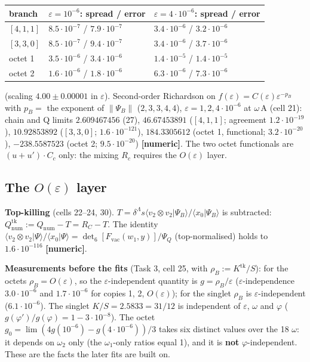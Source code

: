 \documentclass[10pt]{article}
\begin{document}
\begin{center}\small\setlength{\tabcolsep}{3pt}\begin{longtable}{@{}lll@{}}\toprule
\textbf{branch} & \textbf{$\varepsilon=10^{-6}$: spread / error} & \textbf{$\varepsilon=4\cdot10^{-6}$: spread / error} \\\midrule\endhead
$[4,1,1]$ & $8.5\cdot10^{-7}$ / $7.9\cdot10^{-7}$ & $3.4\cdot10^{-6}$ / $3.2\cdot10^{-6}$ \\
$[3,3,0]$ & $8.5\cdot10^{-7}$ / $9.4\cdot10^{-7}$ & $3.4\cdot10^{-6}$ / $3.7\cdot10^{-6}$ \\
octet 1 & $3.5\cdot10^{-6}$ / $3.4\cdot10^{-6}$ & $1.4\cdot10^{-5}$ / $1.4\cdot10^{-5}$ \\
octet 2 & $1.6\cdot10^{-6}$ / $1.8\cdot10^{-6}$ & $6.3\cdot10^{-6}$ / $7.3\cdot10^{-6}$ \\
\bottomrule\end{longtable}\end{center}

(scaling $4.00\pm0.00001$ in $\varepsilon$). Second-order Richardson on $f(\varepsilon)=C(\varepsilon)\varepsilon^{-p_B}$ with $p_B=$ the exponent of $\|\Psi_B\|$ ($2,3,3,4,4$), $\varepsilon=1,2,4\cdot10^{-6}$ at $\omega\,\mathrm{A}$ (cell 21): chain and Q limits $2.609467456$ (27), $46.67453891$ ($[4,1,1]$; agreement $1.2\cdot10^{-19}$), $10.92853892$ ($[3,3,0]$; $1.6\cdot10^{-121}$), $184.3305612$ (octet 1, functional; $3.2\cdot10^{-20}$), $-238.5587523$ (octet 2; $9.5\cdot10^{-20}$) \textbf{[numeric]}. The two octet functionals are $(u+u')\cdot C_c$ only: the mixing $R_c$ requires the $O(\varepsilon)$ layer.

\subsection{The $O(\varepsilon)$ layer}\label{sec:adjO}

\textbf{Top-killing} (cells 22--24, 30). $T=\delta^\Lambda s\langle v_2\otimes v_2|\Psi_B\rangle/\langle x_0|\Psi_B\rangle$ is subtracted: $Q_{\mathrm{num}}^{\mathrm{tk}}:=Q_{\mathrm{num}}-T=R_C-T$. The identity $\langle v_2\otimes v_2|\Psi\rangle/\langle x_0|\Psi\rangle=\det_6[F_{\mathrm{vac}}(w_1,y)]/\Psi_Q$ (top-normalised) holds to $1.6\cdot10^{-116}$ \textbf{[numeric]}.

\textbf{Measurements before the fits} (Task 3, cell 25, with $\rho_B:=K^{\mathrm{tk}}/S$): for the octets $\rho_B=O(\varepsilon)$, so the $\varepsilon$-independent quantity is $g=\rho_B/\varepsilon$ ($\varepsilon$-independence $3.0\cdot10^{-6}$ and $1.7\cdot10^{-6}$ for copies 1, 2, $O(\varepsilon)$); for the singlet $\rho_B$ is $\varepsilon$-independent ($6.1\cdot10^{-6}$). The singlet $K/S=2.5833=31/12$ is independent of $\varepsilon$, $\omega$ and $\varphi$ ($g(\varphi')/g(\varphi)=1-3\cdot10^{-8}$). The octet $g_0=\lim(4g(10^{-6})-g(4\cdot10^{-6}))/3$ takes six distinct values over the 18 $\omega$: it depends on $\omega_2$ only (the $\omega_1$-only ratios equal 1), and it is \textbf{not} $\varphi$-independent. These are the facts the later fits are built on.
\end{document}
